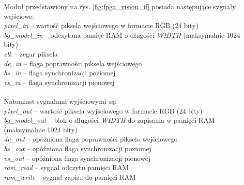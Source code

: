 \noindent Moduł przedstawiony na rys. \ref{fig:fpga_vision_if} posiada następujące sygnały wejściowe:\\
\-\hspace{1cm} \textit{pixel\_in} -- wartość piksela wejściowego w formacie RGB (24 bity)\\
\-\hspace{1cm} \textit{bg\_model\_in} -- odczytana pamięć RAM o długości \textit{WIDTH} (maksymalnie 1024 bity)\\
\-\hspace{1cm} \textit{clk} -- zegar piksela\\
\-\hspace{1cm} \textit{de\_in} -- flaga poprawności piksela wejściowego\\
\-\hspace{1cm} \textit{hs\_in} -- flaga synchronizacji poziomej\\
\-\hspace{1cm} \textit{vs\_in} -- flaga synchronizacji pionowej\\\\
%
Natomiast sygnałami wyjściowymi są:\\
\-\hspace{1cm} \textit{pixel\_out} -- wartość piksela wyjściowego w formacie RGB (24 bity)\\
\-\hspace{1cm} \textit{bg\_model\_out} -- blok o długości \textit{WIDTH} do zapisania w pamięci RAM (maksymalnie 1024 bity)\\
\-\hspace{1cm} \textit{de\_out} -- opóźniona flaga poprawności piksela wejściowego\\
\-\hspace{1cm} \textit{hs\_out} -- opóźniona flaga synchronizacji poziomej\\
\-\hspace{1cm} \textit{vs\_out} -- opóźniona flaga synchronizacji pionowej\\
\-\hspace{1cm} \textit{ram\_read} -- sygnał odczytu pamięci RAM\\
\-\hspace{1cm} \textit{ram\_write} -- sygnał zapisu do pamięci RAM

